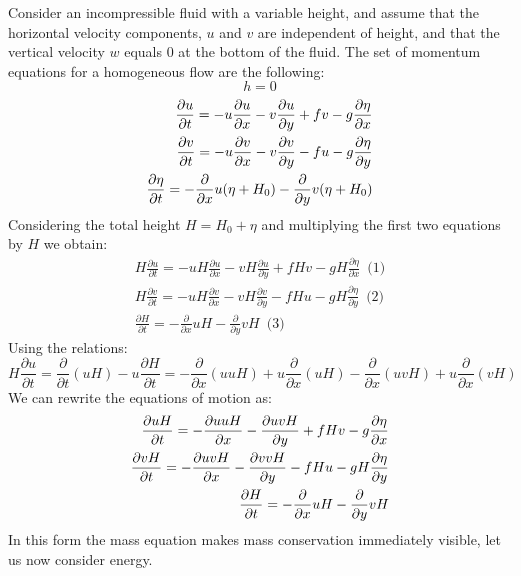 Consider an incompressible fluid with a variable height, and assume that the horizontal velocity components, $u$ and $v$ are independent of height, and that the vertical velocity $w$ equals 0 at the bottom of the fluid. The set of momentum equations for a homogeneous flow are the following:
$$h=0$$
\begin{align}\label{eq.momentum}
	\frac{\partial u}{\partial t}=-u\frac{\partial u}{\partial x}-v\frac{\partial u}{\partial y}+fv-g\frac{\partial\eta}{\partial x}       \\
	\frac{\partial v}{\partial t}=-u\frac{\partial v}{\partial x}-v\frac{\partial v}{\partial y}-fu-g\frac{\partial\eta}{\partial y}\notag \\
	\frac{\partial \eta}{\partial t}=-\frac{\partial}{\partial x}u(\eta+H_0)-\frac{\partial }{\partial y}v(\eta+H_0)\notag
\end{align}
Considering the total height $H=H_0+\eta$ and multiplying the first two equations by $H$ we obtain:
\begin{align*}
	H \frac{\partial u}{\partial t}=-uH\frac{\partial u}{\partial x}-vH\frac{\partial u}{\partial y}+fHv-gH\frac{\partial\eta}{\partial x} \,\,\, \text{(1)} \\
	H\frac{\partial v}{\partial t}=-uH\frac{\partial v}{\partial x}-vH\frac{\partial v}{\partial y}-fHu-gH\frac{\partial\eta}{\partial y}\,\,\, \text{(2)}   \\
	\frac{\partial H}{\partial t}=-\frac{\partial}{\partial x}uH-\frac{\partial }{\partial y}vH \,\,\, \text{(3)}
\end{align*}
Using the relations:
\begin{equation}
	H\frac{\partial u}{\partial t}=\frac{\partial}{\partial t}(uH)-u\frac{\partial H}{\partial t}=-\frac{\partial}{\partial x}(uuH)+u\frac{\partial}{\partial x}(uH)-\frac{\partial}{\partial x}(uvH)+u\frac{\partial}{\partial x}(vH)
\end{equation}
We can rewrite the equations of motion as:
\begin{align}
	\frac{\partial uH}{\partial t}=-\frac{\partial uuH}{\partial x}-\frac{\partial uvH}{\partial y}+fHv-g\frac{\partial\eta}{\partial x}        \\
	\frac{\partial vH}{\partial t}=-\frac{\partial uvH}{\partial x}-\frac{\partial vvH}{\partial y}-fHu-gH\frac{\partial\eta}{\partial y}\notag \\
	\frac{\partial H}{\partial t}=-\frac{\partial}{\partial x}uH-\frac{\partial }{\partial y}vH\notag
\end{align}
In this form the mass equation makes mass conservation immediately visible, let us now consider energy.
